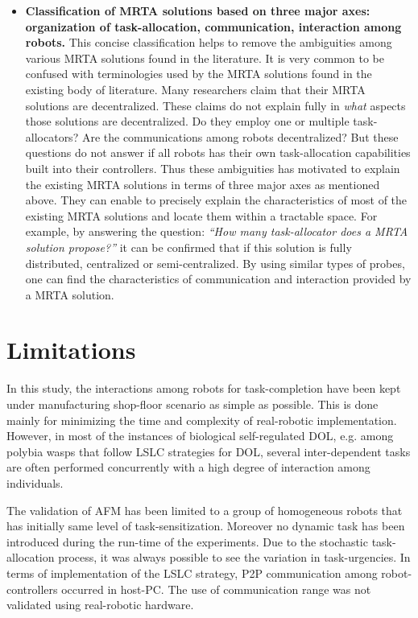 \begin{itemize}
\item \textbf{Classification of MRTA solutions based on three major axes: organization of task-allocation, communication, interaction among robots.} This concise classification helps to remove the ambiguities among various MRTA solutions found in the literature.  It is very common to be confused with terminologies used by the MRTA solutions found in the existing body of literature. Many researchers claim that their MRTA solutions are decentralized. These claims do not explain fully in \textit{what} aspects those solutions are decentralized. Do they employ one or multiple task-allocators? Are the communications among robots decentralized? But these questions do not answer if all robots has their own task-allocation capabilities built into their controllers. Thus these ambiguities has motivated to explain the existing MRTA solutions in terms of three major axes as mentioned above. They can enable to precisely  explain the characteristics of most of the existing MRTA solutions and locate them within a tractable space. For example, by answering the question: \textit{``How many task-allocator does a MRTA solution propose?''} it can be confirmed that if this solution is fully distributed, centralized or semi-centralized. By using similar types of probes, one can find the characteristics of communication and interaction provided by a MRTA solution.
\end{itemize}
\section{Limitations}
In this study, the interactions among robots for task-completion  have been kept under manufacturing shop-floor scenario as simple as possible. This is done mainly for minimizing the time and complexity of real-robotic implementation. However, in most of the instances of biological self-regulated DOL, e.g. among polybia wasps that follow LSLC strategies for DOL, several inter-dependent tasks are often performed concurrently with a high degree of interaction among individuals. 

The validation of AFM has been limited to a group of homogeneous robots that has initially same level of task-sensitization. Moreover no dynamic task has been introduced during the run-time of the experiments. Due to the stochastic task-allocation process, it was always possible to see the  variation in task-urgencies. In terms of implementation of the LSLC strategy, P2P communication among robot-controllers occurred in host-PC. The use of communication range was not validated using real-robotic hardware. 


